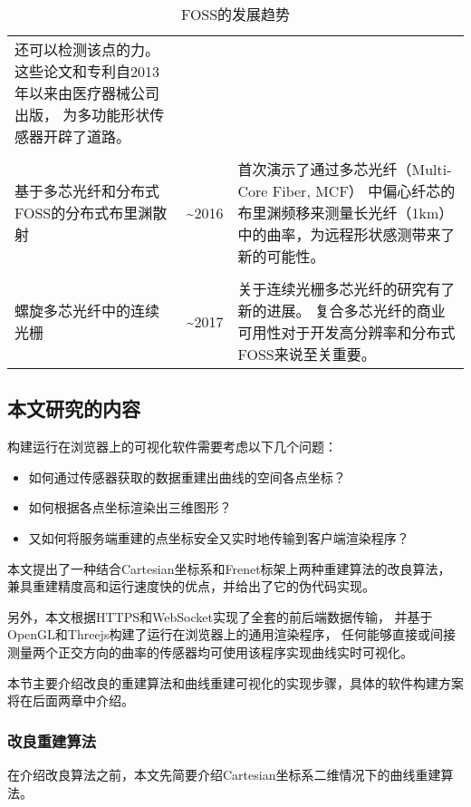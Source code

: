 \begin{table}
\begin{center}
\begin{tabular}{p{}cp{}}
还可以检测该点的力。这些论文和专利自2013年以来由医疗器械公司出版，
为多功能形状传感器开辟了道路。
\\
\\
基于多芯光纤和分布式FOSS的分布式布里渊散射 & \textasciitilde 2016 & 首次演示了通过多芯光纤（Multi-Core Fiber, MCF）
中偏心纤芯的布里渊频移来测量长光纤（1km）中的曲率，为远程形状感测带来了新的可能性。
\\
\\
螺旋多芯光纤中的连续光栅 & \textasciitilde 2017 & 关于连续光栅多芯光纤的研究有了新的进展。
复合多芯光纤的商业可用性对于开发高分辨率和分布式FOSS来说至关重要。
\\
\bottomrule
\end{tabular}
\end{center}
\caption{FOSS的发展趋势\cite{recent-dev-in-foss}}
\label{table:foss}
\end{table}
\FloatBarrier


\subsection{本文研究的内容}

构建运行在浏览器上的可视化软件需要考虑以下几个问题：

\begin{itemize}
\item 如何通过传感器获取的数据重建出曲线的空间各点坐标？
\item 如何根据各点坐标渲染出三维图形？
\item 又如何将服务端重建的点坐标安全又实时地传输到客户端渲染程序？
\end{itemize}

本文提出了一种结合Cartesian坐标系和Frenet标架上两种重建算法的改良算法，
兼具重建精度高和运行速度快的优点，并给出了它的伪代码实现。

另外，本文根据HTTPS和WebSocket实现了全套的前后端数据传输，
并基于OpenGL和Threejs构建了运行在浏览器上的通用渲染程序，
任何能够直接或间接测量两个正交方向的曲率的传感器均可使用该程序实现曲线实时可视化。

本节主要介绍改良的重建算法和曲线重建可视化的实现步骤，具体的软件构建方案将在后面两章中介绍。

\subsubsection{改良重建算法}

在介绍改良算法之前，本文先简要介绍Cartesian坐标系二维情况下的曲线重建算法。


